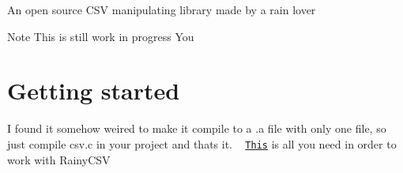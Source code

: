An open source C\+SV manipulating library made by a rain lover ~\newline
 \begin{DoxyNote}{Note}
This is still work in progress You 
\end{DoxyNote}
\hypertarget{index_gs}{}\section{Getting started}\label{index_gs}
I found it somehow weired to make it compile to a {\ttfamily .a} file with only one file, so just compile {\ttfamily csv.\+c} in your project and that\textquotesingle{}s it. ~\newline
 \href{csv_8h.html}{\tt This} is all you need in order to work with Rainy\+C\+SV 
